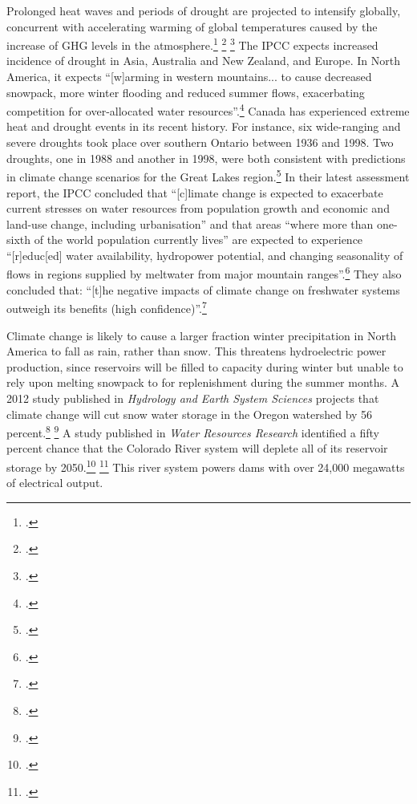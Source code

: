 \documentclass[10pt]{article}
\begin{document}
Prolonged heat waves and periods of drought are projected to intensify globally, concurrent with accelerating warming of global temperatures caused by the increase of GHG levels in the atmosphere.\footcite[][]{Coumou2013} \footcite[See also: ][]{HeatWavesFrequentSevere} \footcite[][]{Tollefson2012}
The IPCC expects increased incidence of drought in Asia, Australia and New Zealand, and Europe.
In North America, it expects ``[w]arming in western mountains... to cause decreased snowpack, more winter flooding and reduced summer flows, exacerbating competition for over-allocated water resources''.\footcite[][See: Synthesis report, Table SPM.2. Examples of some projected regional impacts. \url{https://www.ipcc.ch/publications_and_data/ar4/syr/en/spms3.html}]{IPCC2007}
Canada has experienced extreme heat and drought events in its recent history. 
For instance, six wide-ranging and severe droughts took place over southern Ontario between 1936 and 1998. 
Two droughts, one in 1988 and another in 1998, were both consistent with predictions in climate change scenarios for the Great Lakes region.\footcite[][]{Koshida2005}
In their latest assessment report, the IPCC concluded that ``[c]limate change is expected to exacerbate current stresses on water resources from population growth and economic and land-use change, including urbanisation'' and that areas ``where more than one-sixth of the world population currently lives'' are expected to experience ``[r]educ[ed] water availability, hydropower potential, and changing seasonality of flows in regions supplied by meltwater from major mountain ranges''.\footcite[][p. 49]{IPCCar4_syr}
They also concluded that: ``[t]he negative impacts of climate change on freshwater systems outweigh its benefits (high confidence)''.\footcite[][p. 49]{IPCCar4_syr}



Climate change is likely to cause a larger fraction winter precipitation in North America to fall as rain, rather than snow.
This threatens hydroelectric power production, since reservoirs will be filled to capacity during winter but unable to rely upon melting snowpack to for replenishment during the summer months.
A 2012 study published in \emph{Hydrology and Earth System Sciences} projects that climate change will cut snow water storage in the Oregon watershed by 56 percent.\footcite[][]{Sproles2012} \footcite[][]{OregonSnowpack}
A study published in \emph{Water Resources Research} identified a fifty percent chance that the Colorado River system will deplete all of its reservoir storage by 2050.\footcite[][]{ColoradoReservoirs} \footcite[See also: ][]{DryingWest2011}
This river system powers dams with over 24,000 megawatts of electrical output.
\end{document}
